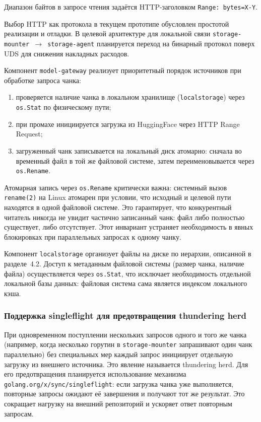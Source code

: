 Диапазон байтов в запросе чтения задаётся HTTP-заголовком \texttt{Range: bytes=X-Y}.

Выбор HTTP как протокола в текущем прототипе обусловлен простотой реализации и отладки. В целевой архитектуре для локальной связи \texttt{storage-mounter $\to$ storage-agent} планируется переход на бинарный протокол поверх UDS для снижения накладных расходов.

Компонент \texttt{model-gateway} реализует приоритетный порядок источников при обработке запроса чанка:
\begin{enumerate}[leftmargin=*]
  \item проверяется наличие чанка в локальном хранилище (\texttt{localstorage}) через \texttt{os.Stat} по физическому пути;
  \item при промахе инициируется загрузка из HuggingFace через HTTP Range Request;
  \item загруженный чанк записывается на локальный диск атомарно: сначала во временный файл в той же файловой системе, затем переименовывается через \texttt{os.Rename}.
\end{enumerate}

Атомарная запись через \texttt{os.Rename} критически важна: системный вызов \texttt{rename(2)} на Linux атомарен при условии, что исходный и целевой пути находятся в одной файловой системе. Это гарантирует, что конкурентный читатель никогда не увидит частично записанный чанк: файл либо полностью существует, либо отсутствует. Этот инвариант устраняет необходимость в явных блокировках при параллельных запросах к одному чанку.

Компонент \texttt{localstorage} организует файлы на диске по иерархии, описанной в разделе~4.2. Доступ к метаданным файловой системы (размер чанка, наличие файла) осуществляется через \texttt{os.Stat}, что исключает необходимость отдельной локальной базы данных: файловая система сама является индексом локального кэша.

\subsubsection{Поддержка singleflight для предотвращения thundering herd}

При одновременном поступлении нескольких запросов одного и того же чанка (например, когда несколько горутин в \texttt{storage-mounter} запрашивают один чанк параллельно) без специальных мер каждый запрос инициирует отдельную загрузку из внешнего источника. Это явление называется thundering herd. Для его предотвращения планируется использование механизма \texttt{golang.org/x/sync/singleflight}: если загрузка чанка уже выполняется, повторные запросы ожидают её завершения и получают тот же результат. Это сокращает нагрузку на внешний репозиторий и ускоряет ответ повторным запросам.

